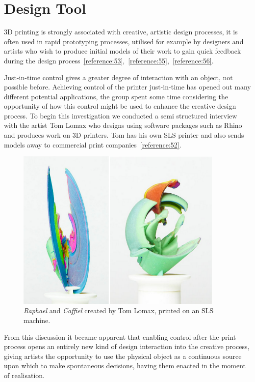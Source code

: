 \documentclass[11pt]{report} %
\begin{document}
\section{Design Tool}
3D printing is strongly associated with creative, artistic design processes, it is often used in rapid prototyping processes, utilised for example by designers and artists who wish to produce initial models of their work to gain quick feedback during the design process~\ref{reference:53},~\ref{reference:55},~\ref{reference:56}.

	Just-in-time control gives a greater degree of interaction with an object, not possible before. Achieving control of the printer just-in-time has opened out many different potential applications, the group spent some time considering the opportunity of how this control might be used to enhance the creative design process. To begin this investigation we conducted a semi structured interview with the artist Tom Lomax who designs using software packages such as Rhino and produces work on 3D printers. Tom has his own SLS printer and also sends models away to commercial print companies~\ref{reference:52}. 

\begin{figure}[H]
  \centering
  \includegraphics[width=4in]{Lomax.png}
  \caption{\textit{Raphael} and \textit{Caffiel} created by Tom Lomax, printed on an SLS machine.}
  \label{figure:Lomax}
\end{figure}

From this discussion it became apparent that enabling control after the print process opens an entirely new kind of design interaction into the creative process, giving artists the opportunity to use the physical object as a continuous source upon which to make spontaneous decisions, having them enacted in the moment of realisation. 
\end{document}
